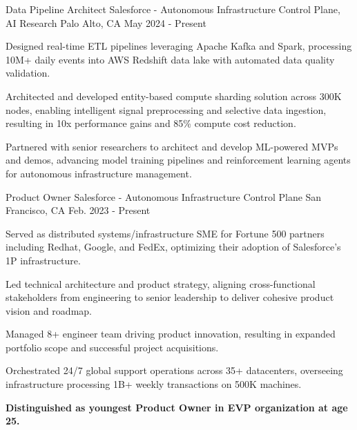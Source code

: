 

\renewcommand{\baselinestretch}{1.3} 
\begin{cventries}
  \cventry
    {Data Pipeline Architect} %
    {Salesforce - Autonomous Infrastructure Control Plane, AI Research} %
    {Palo Alto, CA} %
    {May 2024 - Present} %
    {
      \begin{cvitems} %
        \item {Designed real-time ETL pipelines leveraging Apache Kafka and Spark, processing 10M+ daily events into AWS Redshift data lake with automated data quality validation.}
        \item {Architected and developed entity-based compute sharding solution across 300K nodes, enabling intelligent signal preprocessing and selective data ingestion, resulting in 10x performance gains and 85\% compute cost reduction.}
        \item {Partnered with senior researchers to architect and develop ML-powered MVPs and demos, advancing model training pipelines and reinforcement learning agents for autonomous infrastructure management.}
\end{cvitems}
    }

  \cventry
    {Product Owner} %
    {Salesforce - Autonomous Infrastructure Control Plane} %
    {San Francisco, CA} %
    {Feb. 2023 - Present} %
    {
    \begin{cvitems} %
      \item {Served as distributed systems/infrastructure SME for Fortune 500 partners including Redhat, Google, and FedEx, optimizing their adoption of Salesforce's 1P infrastructure.}
      \item {Led technical architecture and product strategy, aligning cross-functional stakeholders from engineering to senior leadership to deliver cohesive product vision and roadmap.}
      \item {Managed 8+ engineer team driving product innovation, resulting in expanded portfolio scope and successful project acquisitions.}
      \item {Orchestrated 24/7 global support operations across 35+ datacenters, overseeing infrastructure processing 1B+ weekly transactions on 500K machines.}
      \item {\textbf{Distinguished as youngest Product Owner in EVP organization at age 25.}}
    \end{cvitems}
    }


\end{cventries}

